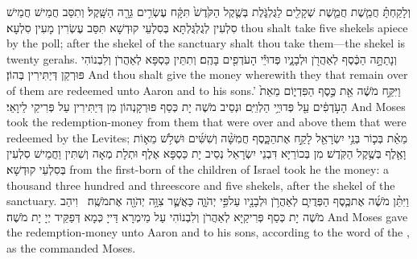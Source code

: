 {וְלָקַחְתָּ֗ חֲמֵ֧שֶׁת חֲמֵ֛שֶׁת שְׁקָלִ֖ים לַגֻּלְגֹּ֑לֶת בְּשֶׁ֤קֶל הַקֹּ֙דֶשׁ֙ תִּקָּ֔ח עֶשְׂרִ֥ים גֵּרָ֖ה הַשָּֽׁקֶל׃}
{וְתִסַּב חֲמֵישׁ חֲמֵישׁ סִלְעִין לְגֻלְגֻּלְתָּא בְּסִלְעֵי קוּדְשָׁא תִּסַּב עֶשְׂרִין מָעִין סִלְעָא׃}
{thou shalt take five shekels apiece by the poll; after the shekel of the sanctuary shalt thou take them—the shekel is twenty gerahs.}{}
{וְנָתַתָּ֣ה הַכֶּ֔סֶף לְאַהֲרֹ֖ן וּלְבָנָ֑יו פְּדוּיֵ֕י הָעֹדְפִ֖ים בָּהֶֽם׃}
{וְתִתֵּין כַּסְפָּא לְאַהֲרֹן וְלִבְנוֹהִי פּוּרְקַן דְּיַתִּירִין בְּהוֹן׃}
{And thou shalt give the money wherewith they that remain over of them are redeemed unto Aaron and to his sons.’}{}
{וַיִּקַּ֣ח מֹשֶׁ֔ה אֵ֖ת כֶּ֣סֶף הַפִּדְי֑וֹם מֵאֵת֙ הָעֹ֣דְפִ֔ים עַ֖ל פְּדוּיֵ֥י הַלְוִיִּֽם׃}
{וּנְסֵיב מֹשֶׁה יָת כְּסַף פּוּרְקָנְהוֹן מִן דְּיַתִּירִין עַל פְּרִיקֵי לֵיוָאֵי׃}
{And Moses took the redemption-money from them that were over and above them that were redeemed by the Levites;}{}
{מֵאֵ֗ת בְּכ֛וֹר בְּנֵ֥י יִשְׂרָאֵ֖ל לָקַ֣ח אֶת\maqqaf הַכָּ֑סֶף חֲמִשָּׁ֨ה וְשִׁשִּׁ֜ים וּשְׁלֹ֥שׁ מֵא֛וֹת וָאֶ֖לֶף בְּשֶׁ֥קֶל הַקֹּֽדֶשׁ׃}
{מִן בְּכוֹרַיָּא דִּבְנֵי יִשְׂרָאֵל נְסֵיב יָת כַּסְפָּא אֶלֶף וּתְלָת מְאָה וְשִׁתִּין וַחֲמֵישׁ סִלְעִין בְּסִלְעֵי קוּדְשָׁא׃}
{from the first-born of the children of Israel took he the money: a thousand three hundred and threescore and five shekels, after the shekel of the sanctuary.}{}
{וַיִּתֵּ֨ן מֹשֶׁ֜ה אֶת\maqqaf כֶּ֧סֶף הַפְּדֻיִ֛ם לְאַהֲרֹ֥ן וּלְבָנָ֖יו עַל\maqqaf פִּ֣י יְהֹוָ֑ה כַּאֲשֶׁ֛ר צִוָּ֥ה יְהֹוָ֖ה אֶת\maqqaf מֹשֶֽׁה׃ \petucha }
{וִיהַב מֹשֶׁה יָת כְּסַף פְּרִיקַיָּא לְאַהֲרֹן וְלִבְנוֹהִי עַל מֵימְרָא דַּייָ כְּמָא דְּפַקֵּיד יְיָ יָת מֹשֶׁה׃}
{And Moses gave the redemption-money unto Aaron and to his sons, according to the word of the \lord, as the \lord\space commanded Moses.}{}

